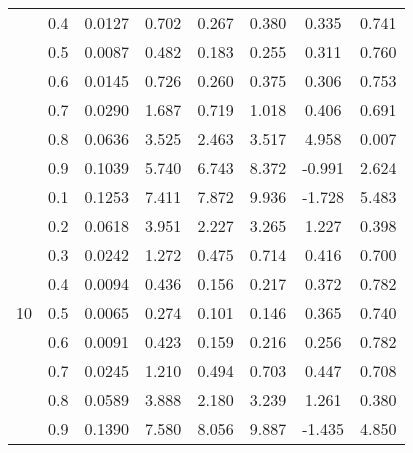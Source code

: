 \documentclass[11pt,a4paper]{report}
\begin{document}
\begin{longtable}{ | c | c || c | c | c | c | c | c | }
 & 0.4 & 0.0127 & 0.702 & 0.267 & 0.380 & 0.335 & 0.741 \\
 & 0.5 & 0.0087 & 0.482 & 0.183 & 0.255 & 0.311 & 0.760 \\
 & 0.6 & 0.0145 & 0.726 & 0.260 & 0.375 & 0.306 & 0.753 \\
 & 0.7 & 0.0290 & 1.687 & 0.719 & 1.018 & 0.406 & 0.691 \\
 & 0.8 & 0.0636 & 3.525 & 2.463 & 3.517 & 4.958 & 0.007 \\
 & 0.9 & 0.1039 & 5.740 & 6.743 & 8.372 & -0.991 & 2.624 \\
 \hline
\multirow{9}{*}{10} & 0.1 & 0.1253 & 7.411 & 7.872 & 9.936 & -1.728 & 5.483 \\
 & 0.2 & 0.0618 & 3.951 & 2.227 & 3.265 & 1.227 & 0.398 \\
 & 0.3 & 0.0242 & 1.272 & 0.475 & 0.714 & 0.416 & 0.700 \\
 & 0.4 & 0.0094 & 0.436 & 0.156 & 0.217 & 0.372 & 0.782 \\
 & 0.5 & 0.0065 & 0.274 & 0.101 & 0.146 & 0.365 & 0.740 \\
 & 0.6 & 0.0091 & 0.423 & 0.159 & 0.216 & 0.256 & 0.782 \\
 & 0.7 & 0.0245 & 1.210 & 0.494 & 0.703 & 0.447 & 0.708 \\
 & 0.8 & 0.0589 & 3.888 & 2.180 & 3.239 & 1.261 & 0.380 \\
 & 0.9 & 0.1390 & 7.580 & 8.056 & 9.887 & -1.435 & 4.850 \\
 \hline
\hline
\end{longtable}
\end{document}
